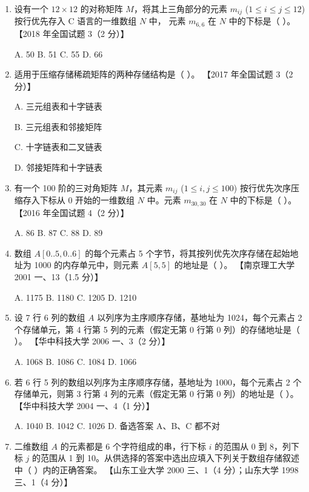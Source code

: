 \documentclass[lang=cn,newtx,10pt,scheme=chinese]{../../elegantbook}
\begin{document}
\begin{enumerate}
    \item 设有一个 $12 \times 12$ 的对称矩阵 $M$，将其上三角部分的元素 $m_{ij}$ ($1 \leq i \leq j \leq 12$) 按行优先存入 C 语言的一维数组 $N$ 中，
    元素 $m_{6,6}$ 在 $N$ 中的下标是（ ）。  
    【2018 年全国试题 3（2 分）】  

    A. 50 \quad B. 51 \quad C. 55 \quad D. 66  

    \item 适用于压缩存储稀疏矩阵的两种存储结构是（ ）。  
    【2017 年全国试题 3（2 分）】  

    A. 三元组表和十字链表  

    B. 三元组表和邻接矩阵  

    C. 十字链表和二叉链表 

    D. 邻接矩阵和十字链表  

    \item 有一个 100 阶的三对角矩阵 $M$，其元素 $m_{ij}$ ($1 \leq i, j \leq 100$) 按行优先次序压缩存入下标从 0 开始的一维数组 $N$ 中。元素 $m_{30,30}$ 在 $N$ 中的下标是（ ）。  
    【2016 年全国试题 4（2 分）】  

    A. 86 \quad B. 87 \quad C. 88 \quad D. 89  

    \item 数组 $A[0..5, 0..6]$ 的每个元素占 5 个字节，将其按列优先次序存储在起始地址为 1000 的内存单元中，则元素 $A[5,5]$ 的地址是（ ）。  
    【南京理工大学 2001 一、13（1.5 分）】 

    A. 1175 \quad B. 1180 \quad C. 1205 \quad D. 1210  

    \item 设 7 行 6 列的数组 $A$ 以列序为主序顺序存储，基地址为 1024，每个元素占 2 个存储单元，第 4 行第 5 列的元素（假定无第 0 行第 0 列）的存储地址是（ ）。  
    【华中科技大学 2006 一、3（2 分）】 

    A. 1068 \quad B. 1086 \quad C. 1084 \quad D. 1066  

    \item 若 6 行 5 列的数组以列序为主序顺序存储，基地址为 1000，每个元素占 2 个存储单元，则第 3 行第 4 列的元素（假定无第 0 行第 0 列）的地址是（ ）。  
    【华中科技大学 2004 一、4（1 分）】 

    A. 1040 \quad B. 1042 \quad C. 1026 \quad D. 备选答案 A、B、C 都不对  

    \item 二维数组 $A$ 的元素都是 6 个字符组成的串，行下标 $i$ 的范围从 0 到 8，列下标 $j$ 的范围从 1 到 10。从供选择的答案中选出应填入下列关于数组存储叙述中（ ）内的正确答案。  
    【山东工业大学 2000 三、1（4 分）；山东大学 1998 三、1（4 分）】  


\end{enumerate}
\end{document}
